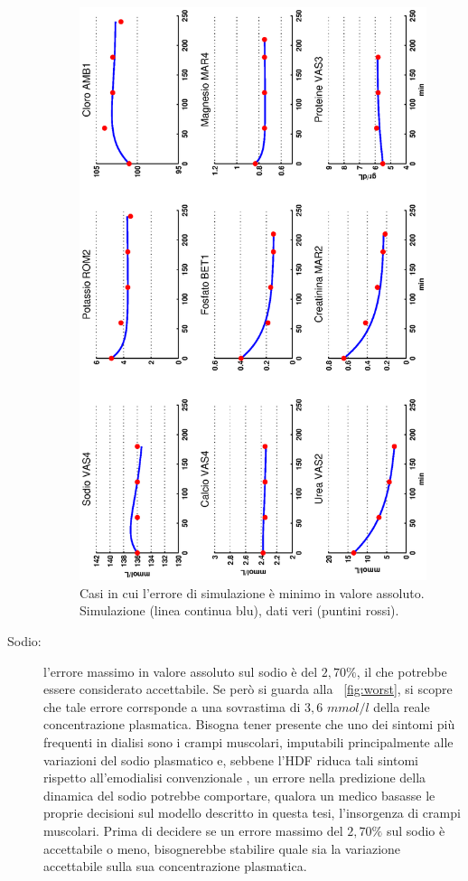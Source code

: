 \begin{description}
\begin{figure}[t]
		\includegraphics[angle=-90, width=1.4\textwidth]{immagini/casi_migliori.eps}
		\caption{Casi in cui l'errore di simulazione è minimo in valore assoluto. Simulazione (linea continua blu), dati veri (puntini rossi).}\label{fig:best}
\end{figure}
	\item[Sodio:] l'errore massimo in valore assoluto sul sodio è del $2,70\%$, il che potrebbe essere considerato accettabile. Se però si guarda alla \figurename~\ref{fig:worst}, si scopre che tale errore corrsponde a una sovrastima di $3,6$ $mmol/l$ della reale concentrazione plasmatica. Bisogna tener presente che uno dei sintomi più frequenti in dialisi sono i crampi muscolari, imputabili principalmente alle variazioni del sodio plasmatico e, sebbene l'HDF riduca tali sintomi rispetto all'emodialisi convenzionale \cite{evolutionHDF}, un errore nella predizione della dinamica del sodio potrebbe comportare, qualora un medico basasse le proprie decisioni sul modello descritto in questa tesi, l'insorgenza di crampi muscolari. Prima di decidere se un errore massimo del $2,70\%$ sul sodio è accettabile o meno, bisognerebbe stabilire quale sia la variazione accettabile sulla sua concentrazione plasmatica.

\end{description}
